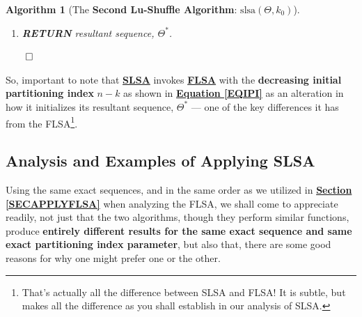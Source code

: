 \documentclass[a4paper, 18pt]{book} %
\newtheorem{alg}{Algorithm}
\begin{document}
\begin{alg}[The \textbf{Second Lu-Shuffle Algorithm}: $\text{slsa}(\Theta, k_0)$]
\begin{enumerate}
{\begin{enumerate}
	\item{\textbf{IF} $k$ is \textbf{ODD}: $(k \mod 2) = 1$:
		\begin{enumerate}
			\item \textbf{UPDATE} \textbf{resultant sequence}, $\Theta^* = \Theta_{rest} \cdot \Theta_{swap}$
		\end{enumerate}
	}
	\item{\textbf{ELSE IF} $k$ is \textbf{EVEN}: $(k \mod 2) = 0$:
		\begin{enumerate}
		\item \textbf{UPDATE} \textbf{resultant sequence}, $\Theta^* = \Theta_{swap} \cdot \Theta_{rest}$
		\end{enumerate}
	}
	
	\item \textbf{INCREMENT} $k$: $k = k + 1$
\end{enumerate}
}
\item \textbf{RETURN} resultant sequence, $\Theta^*$.
\end{enumerate}
$\qed$
\end{alg}

So, important to note that \textbf{\hyperref[ALGLUSHUFFLEB]{SLSA}} invokes \textbf{\hyperref[ALGLUSHUFFLEA]{FLSA}} with the \textbf{decreasing initial partitioning index} $n-k$ as shown in \textbf{\hyperref[EQIPI]{Equation \ref{EQIPI}}} as an alteration in how it initializes its resultant sequence, $\Theta^*$ --- one of the key differences it has from the FLSA\footnote{That's actually all the difference between SLSA and FLSA! It is subtle, but makes all the difference as you shall establish in our analysis of SLSA.}.



\subsection{Analysis and Examples of Applying SLSA}
\label{SECAPPLYSLSA}



Using the same exact sequences, and in the same order as we utilized in \textbf{\hyperref[SECAPPLYFLSA]{Section \ref{SECAPPLYFLSA}}} when analyzing the FLSA, we shall come to appreciate readily, not just that the two algorithms, though they perform similar functions, produce \textbf{entirely different results for the same exact sequence and same exact partitioning index parameter}, but also that, there are some good reasons for why one might prefer one or the other.
\end{document}
